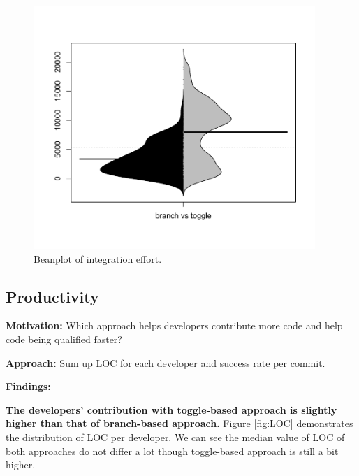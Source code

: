 \begin{figure}
\includegraphics[width=0.95\textwidth]{figure/beforeAfterIE.pdf}
\caption{Beanplot of integration effort.}
\label{fig:integrationEffort}
\end{figure}


\subsection{Productivity}

\textbf{Motivation:}
Which approach helps developers contribute more code and help code being qualified faster?

\textbf{Approach:}
Sum up LOC for each developer and success rate per commit.

\textbf{Findings:} 

\textbf{The developers' contribution with toggle-based approach is slightly higher than that of branch-based approach.} Figure \ref{fig:LOC} demonstrates the distribution of LOC per developer. We can see the median value of LOC of both approaches do not differ a lot though toggle-based approach is still a bit higher.


